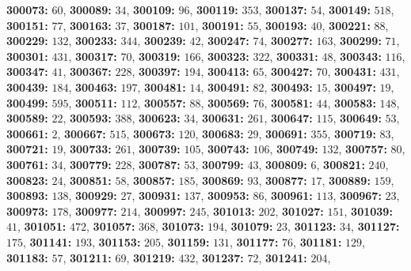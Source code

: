 \textsf{\bfseries 300073:} $60$, \textsf{\bfseries 300089:} $34$, \textsf{\bfseries 300109:} $96$, \textsf{\bfseries 300119:} $353$, \textsf{\bfseries 300137:} $54$, \textsf{\bfseries 300149:} $518$, \textsf{\bfseries 300151:} $77$, \textsf{\bfseries 300163:} $37$, \textsf{\bfseries 300187:} $101$, \textsf{\bfseries 300191:} $55$, \textsf{\bfseries 300193:} $40$, \textsf{\bfseries 300221:} $88$, \textsf{\bfseries 300229:} $132$, \textsf{\bfseries 300233:} $344$, \textsf{\bfseries 300239:} $42$, \textsf{\bfseries 300247:} $74$, \textsf{\bfseries 300277:} $163$, \textsf{\bfseries 300299:} $71$, \textsf{\bfseries 300301:} $431$, \textsf{\bfseries 300317:} $70$, \textsf{\bfseries 300319:} $166$, \textsf{\bfseries 300323:} $322$, \textsf{\bfseries 300331:} $48$, \textsf{\bfseries 300343:} $116$, \textsf{\bfseries 300347:} $41$, \textsf{\bfseries 300367:} $228$, \textsf{\bfseries 300397:} $194$, \textsf{\bfseries 300413:} $65$, \textsf{\bfseries 300427:} $70$, \textsf{\bfseries 300431:} $431$, \textsf{\bfseries 300439:} $184$, \textsf{\bfseries 300463:} $197$, \textsf{\bfseries 300481:} $14$, \textsf{\bfseries 300491:} $82$, \textsf{\bfseries 300493:} $15$, \textsf{\bfseries 300497:} $19$, \textsf{\bfseries 300499:} $595$, \textsf{\bfseries 300511:} $112$, \textsf{\bfseries 300557:} $88$, \textsf{\bfseries 300569:} $76$, \textsf{\bfseries 300581:} $44$, \textsf{\bfseries 300583:} $148$, \textsf{\bfseries 300589:} $22$, \textsf{\bfseries 300593:} $388$, \textsf{\bfseries 300623:} $34$, \textsf{\bfseries 300631:} $261$, \textsf{\bfseries 300647:} $115$, \textsf{\bfseries 300649:} $53$, \textsf{\bfseries 300661:} $2$, \textsf{\bfseries 300667:} $515$, \textsf{\bfseries 300673:} $120$, \textsf{\bfseries 300683:} $29$, \textsf{\bfseries 300691:} $355$, \textsf{\bfseries 300719:} $83$, \textsf{\bfseries 300721:} $19$, \textsf{\bfseries 300733:} $261$, \textsf{\bfseries 300739:} $105$, \textsf{\bfseries 300743:} $106$, \textsf{\bfseries 300749:} $132$, \textsf{\bfseries 300757:} $80$, \textsf{\bfseries 300761:} $34$, \textsf{\bfseries 300779:} $228$, \textsf{\bfseries 300787:} $53$, \textsf{\bfseries 300799:} $43$, \textsf{\bfseries 300809:} $6$, \textsf{\bfseries 300821:} $240$, \textsf{\bfseries 300823:} $24$, \textsf{\bfseries 300851:} $58$, \textsf{\bfseries 300857:} $185$, \textsf{\bfseries 300869:} $93$, \textsf{\bfseries 300877:} $17$, \textsf{\bfseries 300889:} $159$, \textsf{\bfseries 300893:} $138$, \textsf{\bfseries 300929:} $27$, \textsf{\bfseries 300931:} $137$, \textsf{\bfseries 300953:} $86$, \textsf{\bfseries 300961:} $113$, \textsf{\bfseries 300967:} $23$, \textsf{\bfseries 300973:} $178$, \textsf{\bfseries 300977:} $214$, \textsf{\bfseries 300997:} $245$, \textsf{\bfseries 301013:} $202$, \textsf{\bfseries 301027:} $151$, \textsf{\bfseries 301039:} $41$, \textsf{\bfseries 301051:} $472$, \textsf{\bfseries 301057:} $368$, \textsf{\bfseries 301073:} $194$, \textsf{\bfseries 301079:} $23$, \textsf{\bfseries 301123:} $34$, \textsf{\bfseries 301127:} $175$, \textsf{\bfseries 301141:} $193$, \textsf{\bfseries 301153:} $205$, \textsf{\bfseries 301159:} $131$, \textsf{\bfseries 301177:} $76$, \textsf{\bfseries 301181:} $129$, \textsf{\bfseries 301183:} $57$, \textsf{\bfseries 301211:} $69$, \textsf{\bfseries 301219:} $432$, \textsf{\bfseries 301237:} $72$, \textsf{\bfseries 301241:} $204$, 
